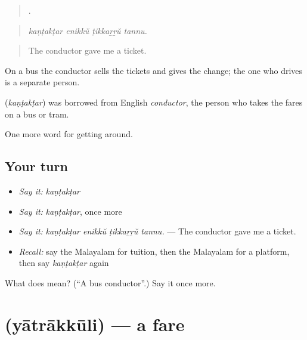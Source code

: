 \begin{quote}
   .
\end{quote}

\begin{quote}
\emph{kaṇṭakṭar enikkŭ ṭikkaṟṟŭ tannu.}
\end{quote}

\begin{quote}
The conductor gave me a ticket.
\end{quote}

On a bus the conductor sells the tickets and gives the change; the one who drives is a separate person.

\begin{cousinweb}
\textbf{} (\emph{kaṇṭakṭar}) was borrowed from English \emph{conductor}, the person who takes the fares on a bus or tram.
\end{cousinweb}

\begin{grammarlens}[title={What you've built}]
One more word for getting around.
\end{grammarlens}

\subsection*{Your turn}
\begin{itemize}
\raggedright
  \item \emph{Say it:} \emph{kaṇṭakṭar}
  \item \emph{Say it:} \emph{kaṇṭakṭar}, once more
  \item \emph{Say it:} \emph{kaṇṭakṭar enikkŭ ṭikkaṟṟŭ tannu.} — The conductor gave me a ticket.
  \item \emph{Recall:} say the Malayalam for tuition, then the Malayalam for a platform, then say \emph{kaṇṭakṭar} again
\end{itemize}

\begin{tcolorbox}[breakable,colback=teal!4,colframe=teal!35!black,title={Before you move on}]
What does  mean? (\textquotedblleft{}A bus conductor\textquotedblright{}.) Say it once more.
\end{tcolorbox}
\section[\texorpdfstring{\ml{യാത്രാക്കൂലി} (yātrākkūli)}{യാത്രാക്കൂലി (yātrākkūli)}]{ (yātrākkūli) — a fare}

